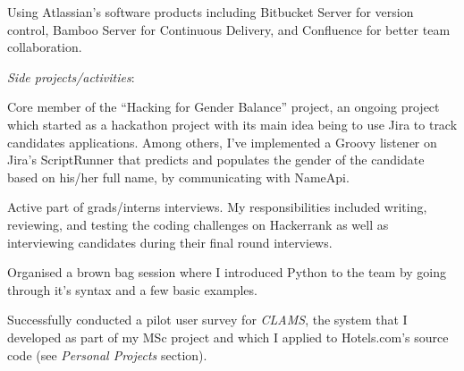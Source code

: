 \begin{cventries}
{\begin{cvitems}
        \item {Using Atlassian's software products including Bitbucket Server for version control, Bamboo Server for Continuous Delivery, and Confluence for better team collaboration.}
       \end{cvitems}
       \vspace{15pt}
       \textit{Side projects/activities}:
       \vspace{12pt}
       \begin{cvitems}
        \item {Core member of the ``Hacking for Gender Balance'' project, an ongoing project which started as a hackathon project with its main idea being to use Jira to track candidates applications. Among others, I've implemented a Groovy listener on Jira's ScriptRunner that predicts and populates the gender of the candidate based on his/her full name, by communicating with NameApi.}
        \item {Active part of grads/interns interviews. My responsibilities included writing, reviewing, and testing the coding challenges on Hackerrank as well as interviewing candidates during their final round interviews.}
        \item{Organised a brown bag session where I introduced Python to the team by going through it's syntax and a few basic examples.}
        \item{Successfully conducted a pilot user survey for \textit{CLAMS}, the system that I developed as part of my MSc project and which I applied to Hotels.com's source code (see \textit{Personal Projects} section).}
      \end{cvitems}
    }

\end{cventries}

